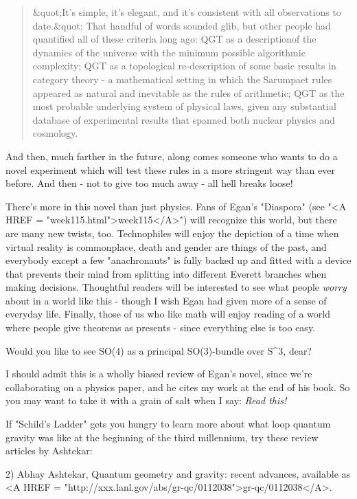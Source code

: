 \begin{quote}
    &quot;It's simple, it's elegant, and it's consistent with all 
    observations to date.&quot;  That handful of words sounded glib, 
    but other people had quantified all of these criteria long ago: 
    QGT as a descriptionof the dynamics of the universe with the 
    minimum possible algorithmic complexity; QGT as a topological 
    re-description of some basic results in category theory - a 
    mathematical setting in which the Sarumpaet rules appeared as 
    natural and inevitable as the rules of arithmetic; QGT as the 
    most probable underlying system of physical laws, given any 
    substantial database of experimental results that spanned both
    nuclear physics and cosmology.
\end{quote}
    

And then, much farther in the future, along comes someone who wants to
do a novel experiment which will test these rules in a more stringent
way than ever before.  And then - not to give too much away - all hell
breaks loose!

There's more in this novel than just physics.  Fans of Egan's
"Diaspora" (see "<A HREF =
"week115.html">week115</A>") will recognize this world, but there
are many new twists, too.  Technophiles will enjoy the depiction of a
time when virtual reality is commonplace, death and gender are things of
the past, and everybody except a few "anachronauts" is fully
backed up and fitted with a device that prevents their mind from
splitting into different Everett branches when making decisions.
Thoughtful readers will be interested to see what people \emph{worry} about
in a world like this - though I wish Egan had given more of a sense of
everyday life.  Finally, those of us who like math will enjoy reading of
a world where people give theorems as presents - since everything else
is too easy.  

Would you like to see SO(4) as a principal SO(3)-bundle
over S^{3}, dear?

I should admit this is a wholly biased review of Egan's novel, since 
we're collaborating on a physics paper, and he cites my work at the 
end of his book.  So you may want to take it with a grain of salt 
when I say: \emph{Read this!}  

If "Schild's Ladder" gets you hungry to learn more about what loop
quantum gravity was like at the beginning of the third millennium, 
try these review articles by Ashtekar:

2) Abhay Ashtekar, Quantum geometry and gravity: recent advances,
available as <A HREF = "http://xxx.lanl.gov/abs/gr-qc/0112038">gr-qc/0112038</A>.

